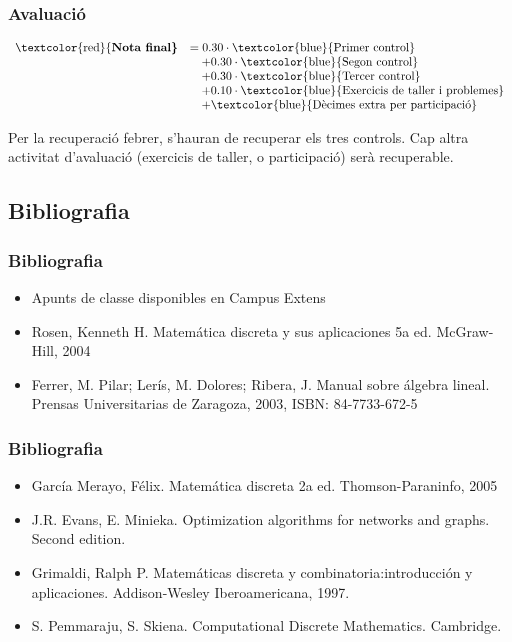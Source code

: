 \documentclass[12pt,t]{beamer}
\newcommand{\red}[1]{\textcolor{red}{#1}}
\newcommand{\blue}[1]{\textcolor{blue}{#1}}
\theoremstyle{plain}
\theoremstyle{definition}
\begin{document}
\begin{frame}
\frametitle{Avaluació}

$$
\begin{array}{rl}
\mbox{\red{\bf Nota final}} & =0.30\cdot \mbox{\blue{Primer control}}\\
& \quad+0.30 \cdot\mbox{\blue{Segon control}}\\
& \quad+0.30 \cdot\mbox{\blue{Tercer control}}\\
& \quad +0.10 \cdot\mbox{\blue{Exercicis de taller i problemes}}\\
& \quad +\mbox{\blue{Dècimes extra per participació}}
\end{array}
$$
\bigskip

Per la recuperació febrer, s'hauran de recuperar els tres controls. Cap altra activitat d'avaluació (exercicis de taller, o participació) serà recuperable.


\end{frame}


\subsection{Bibliografia}

\begin{frame}
\frametitle{Bibliografia}

\begin{itemize} 

\item Apunts de classe disponibles en Campus Extens 
\item Rosen, Kenneth H. Matemática discreta y sus aplicaciones 5a ed. McGraw-Hill, 2004 
\item Ferrer, M. Pilar; Lerís, M. Dolores; Ribera, J. Manual sobre álgebra lineal. Prensas Universitarias de Zaragoza, 2003, ISBN: 84-7733-672-5

\end{itemize}

\end{frame}



\begin{frame}
\frametitle{Bibliografia}

\begin{itemize} 


\item  García Merayo, Félix. Matemática discreta 2a ed. Thomson-Paraninfo, 2005 
\item J.R. Evans, E. Minieka. Optimization algorithms for networks and graphs. Second edition. 
\item Grimaldi, Ralph P. Matemáticas discreta y combinatoria:introducción y aplicaciones. Addison-Wesley Iberoamericana, 1997. 
\item S. Pemmaraju, S. Skiena. Computational Discrete Mathematics. Cambridge.
\end{itemize}

\end{frame}
\end{document}
